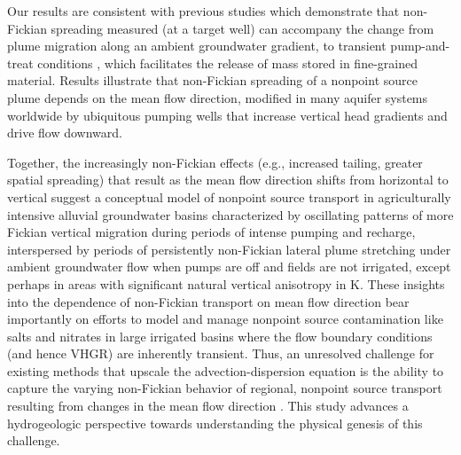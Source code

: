 Our results are consistent with previous studies which demonstrate that non-Fickian spreading measured (at a target well) can accompany the change from plume migration along an ambient groundwater gradient, to transient pump-and-treat conditions \citep{labolle2001role, guo2019upscaling, guswa2000slow}, which facilitates the release of mass stored in fine-grained material. Results illustrate that non-Fickian spreading of a nonpoint source plume depends on the mean flow direction, modified in many aquifer systems worldwide by ubiquitous pumping wells \citep{Famiglietti2014, Gleeson2012, wada2010global} that increase vertical head gradients and drive flow downward. 

Together, the increasingly non-Fickian effects (e.g., increased tailing, greater spatial spreading) that result as the mean flow direction shifts from horizontal to vertical suggest a conceptual model of nonpoint source transport in agriculturally intensive alluvial groundwater basins characterized by oscillating patterns of more Fickian vertical migration during periods of intense pumping and recharge, interspersed by periods of persistently non-Fickian lateral plume stretching under ambient groundwater flow when pumps are off and fields are not irrigated, except perhaps in areas with significant natural vertical anisotropy in K. These insights into the dependence of non-Fickian transport on mean flow direction bear importantly on efforts to model and manage nonpoint source contamination like salts \citep{hansen2018quantifying} and nitrates \citep{pasten2014assessment} in large irrigated basins where the flow boundary conditions (and hence VHGR) are inherently transient. Thus, an unresolved challenge for existing methods that upscale the advection-dispersion equation \citep{neuman2009perspective} is the ability to capture the varying non-Fickian behavior of regional, nonpoint source transport resulting from changes in the mean flow direction \citep{guo2020adaptive}. This study advances a hydrogeologic perspective towards understanding the physical genesis of this challenge.




